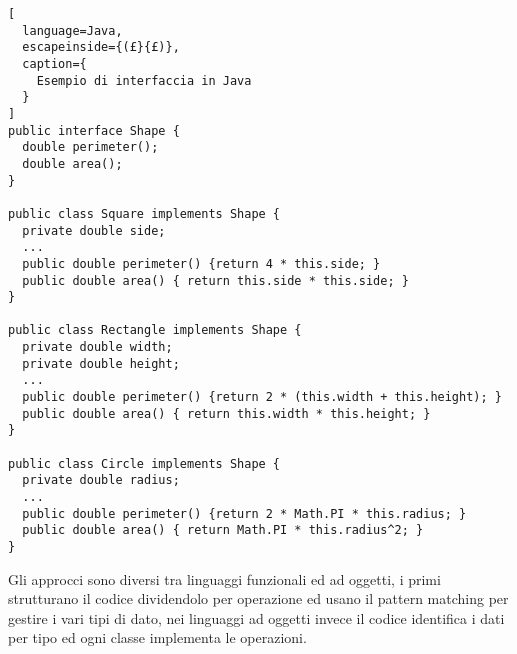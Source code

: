 \begin{lstlisting}[
  language=Java,
  escapeinside={(£}{£)},
  caption={
    Esempio di interfaccia in Java
  }
]
public interface Shape {
  double perimeter();
  double area();
}

public class Square implements Shape {
  private double side;
  ...
  public double perimeter() {return 4 * this.side; }
  public double area() { return this.side * this.side; }
}

public class Rectangle implements Shape {
  private double width;
  private double height;
  ...
  public double perimeter() {return 2 * (this.width + this.height); }
  public double area() { return this.width * this.height; }
}

public class Circle implements Shape {
  private double radius;
  ...
  public double perimeter() {return 2 * Math.PI * this.radius; }
  public double area() { return Math.PI * this.radius^2; }
}
\end{lstlisting}

Gli approcci sono diversi tra linguaggi funzionali ed ad oggetti, i primi
strutturano il codice dividendolo per operazione ed usano il pattern matching
per gestire i vari tipi di dato, nei linguaggi ad oggetti invece il codice
identifica i dati per tipo ed ogni classe implementa le operazioni.
